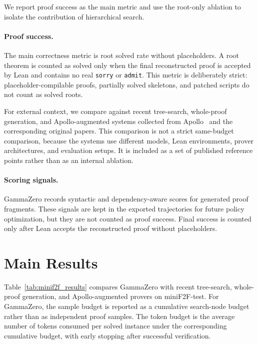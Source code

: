 We report proof success as the main metric and use the root-only ablation to isolate the contribution
of hierarchical search.

\paragraph{Proof success.}
The main correctness metric is root solved rate without placeholders. A root theorem is counted as solved only when the final reconstructed proof is accepted by Lean and contains no real \texttt{sorry} or \texttt{admit}. This metric is deliberately strict: placeholder-compilable proofs, partially solved skeletons, and patched scripts do not count as solved roots.

For external context, we compare against recent tree-search, whole-proof generation, and
Apollo-augmented systems collected from Apollo~\citep{apollo} and the corresponding original papers.
This comparison is not a strict same-budget comparison, because the systems use different models,
Lean environments, prover architectures, and evaluation setups. It is included as a set of published
reference points rather than as an internal ablation.

\paragraph{Scoring signals.}
GammaZero records syntactic and dependency-aware scores for generated proof fragments. These signals
are kept in the exported trajectories for future policy optimization, but they are not counted as proof
success. Final success is counted only after Lean accepts the reconstructed proof without placeholders.

\section{Main Results}

Table~\ref{tab:minif2f_results} compares GammaZero with recent tree-search, whole-proof
generation, and Apollo-augmented provers on miniF2F-test. For GammaZero, the sample budget is
reported as a cumulative search-node budget rather than as independent proof samples. The token
budget is the average number of tokens consumed per solved instance under the corresponding
cumulative budget, with early stopping after successful verification.

